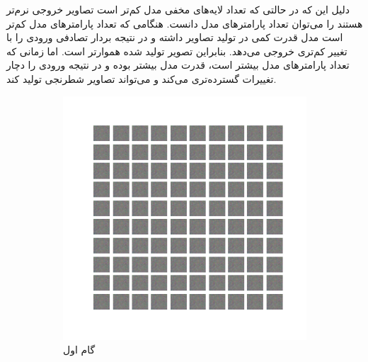 \documentclass[12pt, a4paper]{book}
\begin{document}
دلیل این که در حالتی که تعداد لایه‌های مخفی مدل کم‌تر است تصاویر خروجی نرم‌تر هستند را می‌توان
تعداد پارامتر‌های مدل دانست. هنگامی که تعداد پارامتر‌های مدل کم‌تر است مدل قدرت کمی در تولید تصاویر داشته و در نتیجه
بردار تصادفی ورودی را با تغییر کم‌تری خروجی می‌دهد. بنابراین تصویر تولید شده هموارتر است. اما زمانی که تعداد پارامتر‌های
مدل بیشتر است، قدرت مدل بیشتر بوده و در نتیجه ورودی را دچار تغییرات گسترده‌تری می‌کند و می‌تواند تصاویر
شطرنجی تولید کند.

\begin{figure}[h]
    \begin{subfigure}{0.3\linewidth}
        \includegraphics[width=\linewidth]{images/fcgan/nlayer1/generated_img_01.png}
        \caption{گام اول}
    \end{subfigure}
    \begin{subfigure}{0.3\linewidth}

\end{subfigure}
\end{figure}
\end{document}
